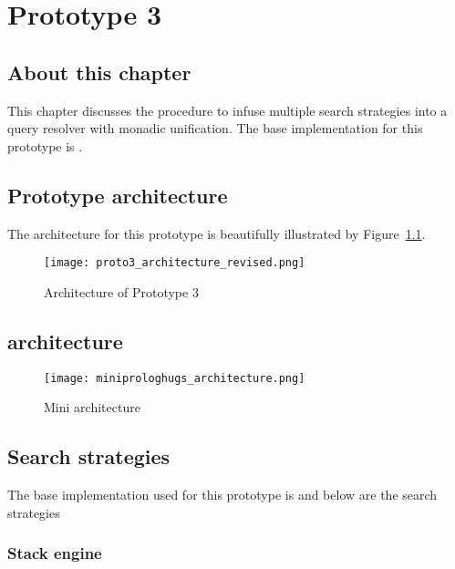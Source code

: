 \documentclass[thesis-solanki.tex]{files}
\begin{document}
\chapter{Prototype 3}{\label{proto3}}


\section{About this chapter}
This chapter discusses the procedure to infuse multiple search strategies into a  query resolver with monadic unification. 
The base implementation for this prototype is  \cite{website:mini-prolog-hugs98}.

\section{Prototype architecture}
The architecture for this prototype is beautifully illustrated by Figure~\ref{fig:architecture-proto-3}. 

\begin{figure}[H]
  \texttt{[image: proto3\_architecture\_revised.png]}
\vspace*{-1cm}
  \caption{Architecture of Prototype 3}
  \label{fig:architecture-proto-3}
\end{figure}


\section{ \cite{website:mini-prolog-hugs98} architecture}

\begin{figure}[H]
	\centering
  \texttt{[image: miniprologhugs\_architecture.png]}
  \caption{Mini  architecture}
  \label{fig:miniprlgarchitecture}
\end{figure}

\section{Search strategies}
The base implementation used for this prototype  is \cite{website:mini-prolog-hugs98} and below are the search
strategies
\subsection{Stack engine}
\begin{singlespace}
\inputminted[linenos, firstline=29, lastline=62]{haskell}{haskell-proto3-sudsy-woe.hs}
\end{singlespace}
\end{document}
